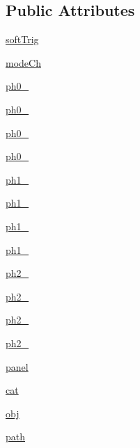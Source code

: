 \subsection*{Public Attributes}
\begin{DoxyCompactItemize}
\item 
\hyperlink{classProtoFEB__v1_1_1ProtoFEB__v1_ad7ba35e015e88cd43cad53cd547c3183}{soft\+Trig}
\item 
\hyperlink{classProtoFEB__v1_1_1ProtoFEB__v1_acd03f62f5c3c9829f4f0c7407735e352}{mode\+Ch}
\item 
\hyperlink{classProtoFEB__v1_1_1ProtoFEB__v1_ad56c4acc735e7ed9adb2ceaae9b49967}{ph0\+\_}
\item 
\hyperlink{classProtoFEB__v1_1_1ProtoFEB__v1_a5df64173851dcb2336e8d1945395e18b}{ph0\+\_}
\item 
\hyperlink{classProtoFEB__v1_1_1ProtoFEB__v1_a11f3b349eff03ea1c92ee05250b3d90a}{ph0\+\_}
\item 
\hyperlink{classProtoFEB__v1_1_1ProtoFEB__v1_a8be787a32630c27da6d2f8df2b8327b7}{ph0\+\_}
\item 
\hyperlink{classProtoFEB__v1_1_1ProtoFEB__v1_a833962f3b85e9c491848a4a64dde8f74}{ph1\+\_}
\item 
\hyperlink{classProtoFEB__v1_1_1ProtoFEB__v1_a9bb0c9261386773dd989beaf53de4d8a}{ph1\+\_}
\item 
\hyperlink{classProtoFEB__v1_1_1ProtoFEB__v1_a7d1308870c80a521331a1a0fdd5c8146}{ph1\+\_}
\item 
\hyperlink{classProtoFEB__v1_1_1ProtoFEB__v1_ae339986ae050d7709b091d38120f2c80}{ph1\+\_}
\item 
\hyperlink{classProtoFEB__v1_1_1ProtoFEB__v1_a8b6ff4697318f769fa262a5b5e4337d7}{ph2\+\_}
\item 
\hyperlink{classProtoFEB__v1_1_1ProtoFEB__v1_a6995895b0ffb6616f91a016d03667417}{ph2\+\_}
\item 
\hyperlink{classProtoFEB__v1_1_1ProtoFEB__v1_a28e21b4f4ad3988f2bed8299a80be79a}{ph2\+\_}
\item 
\hyperlink{classProtoFEB__v1_1_1ProtoFEB__v1_acb94f3e4d4d4011dd262ebe2e98ecff4}{ph2\+\_}
\item 
\hyperlink{classelement_1_1element_a0fce7cee12f437717c882d0965e46235}{panel}
\item 
\hyperlink{classobject_1_1object_af114388a80cca208c152ffeca0e89e23}{cat}
\item 
\hyperlink{classobject_1_1object_a82b61e7cd7e18b1f9de10fc832e5b75e}{obj}
\item 
\hyperlink{classobject_1_1object_a2a518f960961d791b0f900a90c3cd287}{path}
\end{DoxyCompactItemize}
